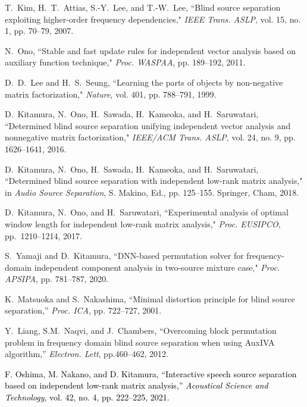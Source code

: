 \documentclass[honka]{nitkagawathesis}%
\newcommand{\red}[1]{\textcolor{black}{#1}}
\begin{document}
\begin{thebibliography}{99}
  T.~Kim, H.~T.~Attias, S.-Y.~Lee, and T.-W.~Lee, ``Blind source separation exploiting higher-order frequency dependencies," {\em  IEEE Trans. ASLP}, vol. 15, no. 1, pp. 70--79, 2007.
  
  N.~Ono, ``Stable and fast update rules for independent vector analysis based on auxiliary function technique," {\em  Proc. WASPAA}, pp. 189--192, 2011.
  
  D.~D.~Lee and H.~S.~Seung, ``Learning the parts of objects by non-negative matrix factorization," {\em Nature}, vol. 401, pp. 788--791, 1999.
  
  D.~Kitamura, N.~Ono, H.~Sawada, H.~Kameoka, and H.~Saruwatari, ``Determined blind source separation unifying independent vector analysis and nonnegative matrix factorization,"  {\em IEEE/ACM Trans. ASLP}, vol. 24, no. 9, pp. 1626--1641, 2016.
  
  D.~Kitamura, N.~Ono, H.~Sawada, H.~Kameoka, and H.~Saruwatari, ``Determined blind source separation with independent low-rank matrix analysis," in  {\em Audio Source Separation}, S. Makino, Ed., pp. 125--155. Springer, Cham, 2018.
  
  D.~Kitamura, N.~Ono, and H.~Saruwatari, ``Experimental analysis of optimal window length for independent low-rank matrix analysis,"  {\em Proc. EUSIPCO}, pp.~1210--1214, 2017.

  S.~Yamaji and D.~Kitamura, ``DNN-based permutation solver for frequency-domain independent component analysis in two-source mixture case," {\em  Proc. APSIPA}, pp. 781–787, 2020.
  
  
  K.~Matsuoka and S.~Nakashima, ``Minimal distortion principle for blind source separation,'' {\em Proc. ICA}, pp. 722--727, 2001.
  
  Y.~Liang, S.M.~Naqvi, and J.~Chambers, ``Overcoming block permutation
  problem in frequency domain blind source separation when using
  AuxIVA algorithm,'' {\em Electron. Lett}, pp.460--462, 2012.

  \red{F. Oshima, M. Nakano, and D. Kitamura, ``Interactive speech source separation based on independent low-rank matrix analysis,'' {\em Acoustical Science and Technology}, vol. 42, no. 4, pp. 222--225, 2021.}
  

\end{thebibliography}
\end{document}
